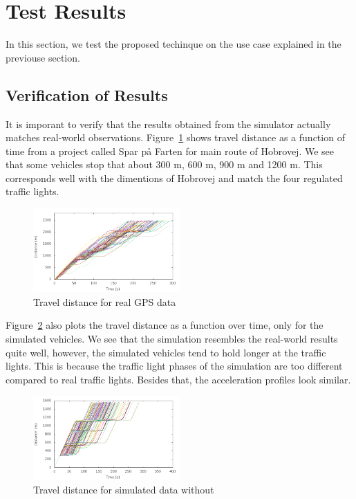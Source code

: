 \section{Test Results}\label{sec:Test}
In this section, we test the proposed techinque on the use case explained in the previouse section.

\subsection{Verification of Results}
It is imporant to verify that the results obtained from the simulator actually matches real-world observations.
Figure~\ref{fig:TestResults:realDistance} shows travel distance as a function of time from a project called Spar på Farten\cite{} for main route of Hobrovej.
We see that some vehicles stop that about 300 m, 600 m, 900 m and 1200 m.
This corresponds well with the dimentions of Hobrovej and match the four regulated traffic lights. 

\begin{figure}[htb]
\includegraphics[width=0.5\textwidth]{../images/Real/RealDistance.png}
\caption{Travel distance for real GPS data}
\label{fig:TestResults:realDistance}
\end{figure}

Figure~\ref{fig:TestResults:distance0} also plots the travel distance as a function over time, only for the simulated vehicles.
We see that the simulation resembles the real-world results quite well, however, the simulated vehicles tend to hold longer at the traffic lights. 
This is because the traffic light phases of the simulation are too different compared to real traffic lights. 
Besides that, the acceleration profiles look similar.

\begin{figure}[htb]
\includegraphics[width=0.5\textwidth]{../images/tp0c1_0/distanceUncontrolled0.png}
\caption{Travel distance for simulated data without \tech}
\label{fig:TestResults:distance0}
\end{figure}

